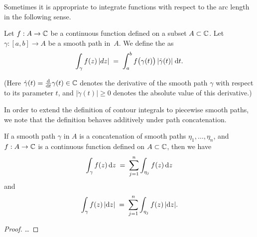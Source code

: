 Sometimes it is appropriate to integrate functions with respect to the
arc length in the following sense.
\begin{definition}
  \label{def:smooth_arc_length_integral}
  Let $f : A \to \mathbb{C}$ be a continuous function defined on a subset $A \subset \mathbb{C}$.
  Let $\gamma \colon [a,b] \to A$ be a smooth path in~$A$.
  We define the  as
  \begin{align*}
    \int_\gamma f(z) \, |dz|
    \; = \; \int_a^b f \big( \gamma(t) \big) \, |\dot{\gamma}(t)| \; \mathrm{d} t .
  \end{align*}

  (Here $\dot{\gamma}(t) = \frac{\mathrm{d}}{\mathrm{d} t} \gamma(t) \in \mathbb{C}$ denotes the
  derivative of the smooth path $\gamma$ with respect to its parameter $t$,
  and $|\dot{\gamma}(t)| \ge 0$ denotes the absolute value of this derivative.)
\end{definition}

In order to extend the definition of contour integrals to piecewise smooth paths,
we note that the definition behaves additively under path concatenation.

\begin{lemma}
  \label{lem:integral_concatenation}
  If a smooth path $\gamma$ in $A$ is a concatenation of smooth
  paths $\eta_1, \ldots, \eta_n$, and
  $f : A \to \mathbb{C}$ is a continuous function defined on $A \subset \mathbb{C}$,
  then we have
  \begin{align*}
    \int_\gamma f(z) \, \mathrm{d} z \; = \; \sum_{j=1}^n \int_{\eta_j} f(z) \, \mathrm{d} z
  \end{align*}
  and
  \begin{align*}
    \int_\gamma f(z) \, |\mathrm{d} z| \; = \; \sum_{j=1}^n \int_{\eta_j} f(z) \, |\mathrm{d} z| .
  \end{align*}
\end{lemma}
\begin{proof}
  \ldots
\end{proof}

